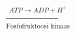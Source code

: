 \documentclass[preview]{standalone}
\begin{document}
\begin{align*}
\xrightarrow[\text{Fosfofruktoosi kinaas}]{ATP \rightarrow ADP + H^{+}}
\end{align*}
\end{document}
